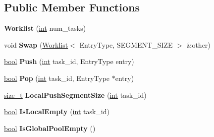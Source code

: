 \subsection*{Public Member Functions}
\begin{DoxyCompactItemize}
\item 
\mbox{\label{classv8_1_1internal_1_1Worklist_a80026cf4e50a6a907434d59468d8ff49}} 
{\bfseries Worklist} (\mbox{\hyperlink{classint}{int}} num\+\_\+tasks)
\item 
\mbox{\label{classv8_1_1internal_1_1Worklist_a02fb6c5571c0f8857e5b2e1a6678fded}} 
void {\bfseries Swap} (\mbox{\hyperlink{classv8_1_1internal_1_1Worklist}{Worklist}}$<$ Entry\+Type, S\+E\+G\+M\+E\+N\+T\+\_\+\+S\+I\+ZE $>$ \&other)
\item 
\mbox{\label{classv8_1_1internal_1_1Worklist_ac638c54ab8a4f8021e2e0c1e31a99f72}} 
\mbox{\hyperlink{classbool}{bool}} {\bfseries Push} (\mbox{\hyperlink{classint}{int}} task\+\_\+id, Entry\+Type entry)
\item 
\mbox{\label{classv8_1_1internal_1_1Worklist_a9bd282d04d7e84f3dcd8cd04b5377ee9}} 
\mbox{\hyperlink{classbool}{bool}} {\bfseries Pop} (\mbox{\hyperlink{classint}{int}} task\+\_\+id, Entry\+Type $\ast$entry)
\item 
\mbox{\label{classv8_1_1internal_1_1Worklist_a71f34c284c55b56e488760827f03979b}} 
\mbox{\hyperlink{classsize__t}{size\+\_\+t}} {\bfseries Local\+Push\+Segment\+Size} (\mbox{\hyperlink{classint}{int}} task\+\_\+id)
\item 
\mbox{\label{classv8_1_1internal_1_1Worklist_a8d75237b8b72463e8e5cb6b8af7e8386}} 
\mbox{\hyperlink{classbool}{bool}} {\bfseries Is\+Local\+Empty} (\mbox{\hyperlink{classint}{int}} task\+\_\+id)
\item 
\mbox{\label{classv8_1_1internal_1_1Worklist_ad6f6b350de8c4121e394ee9253ea2d1f}} 
\mbox{\hyperlink{classbool}{bool}} {\bfseries Is\+Global\+Pool\+Empty} ()
\item 
\mbox{\label{classv8_1_1internal_1_1Worklist_aaacb777f8a253298f45b96a9b61736e7}} 

\end{DoxyCompactItemize}
